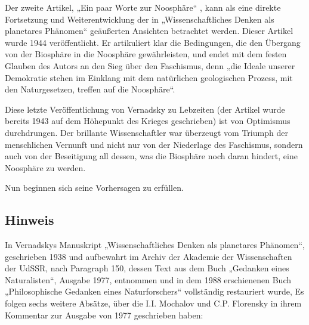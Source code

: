 \documentclass[11pt,a4paper]{article}
\begin{document}
Der zweite Artikel, „Ein paar Worte zur Noosphäre“ \cite{Vernadsky1944}, kann
als eine direkte Fortsetzung und Weiterentwicklung der in „Wissenschaftliches
Denken als planetares Phänomen“ geäußerten Ansichten betrachtet werden. Dieser
Artikel wurde 1944 veröffentlicht. Er artikuliert klar die Bedingungen, die
den Übergang von der Biosphäre in die Noosphäre gewährleisten, und endet mit
dem festen Glauben des Autors an den Sieg über den Faschismus, denn „die
Ideale unserer Demokratie stehen im Einklang mit dem natürlichen geologischen
Prozess, mit den Naturgesetzen, treffen auf die Noosphäre“.

Diese letzte Veröffentlichung von Vernadsky zu Lebzeiten (der Artikel wurde
bereits 1943 auf dem Höhepunkt des Krieges geschrieben) ist von Optimismus
durchdrungen. Der brillante Wissenschaftler war überzeugt vom Triumph der
menschlichen Vernunft und nicht nur von der Niederlage des Faschismus, sondern
auch von der Beseitigung all dessen, was die Biosphäre noch daran hindert,
eine Noosphäre zu werden.

Nun beginnen sich seine Vorhersagen zu erfüllen.

\subsection{Hinweis}

In Vernadskys Manuskript „Wissenschaftliches Denken als planetares Phänomen“,
geschrieben 1938 und aufbewahrt im Archiv der Akademie der Wissenschaften der
UdSSR, nach Paragraph 150, dessen Text aus dem Buch „Gedanken eines
Naturalisten“, Ausgabe 1977, entnommen und in dem 1988 erschienenen Buch
„Philosophische Gedanken eines Naturforschers“ vollständig restauriert wurde,
Es folgen sechs weitere Absätze, über die I.I. Mochalov und C.P. Florensky
in ihrem Kommentar zur Ausgabe von 1977 geschrieben haben:
\end{document}
